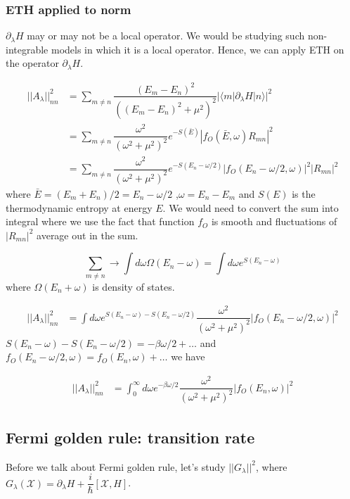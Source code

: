 \documentclass[11pt,a4paper]{article}
\begin{document}
\subsubsection{ETH applied to norm}
$\partial_{\lambda}H$ may or may not be a local operator. We would be studying such non-integrable models in which it is a local operator. Hence, we can apply ETH on the operator $\partial_{\lambda}H$.

\begin{align*}
||A_{\lambda}||^2_{nn} &= \sum_{m \neq n}  \dfrac{(E_m-E_n)^2}{((E_m-E_n)^2 + \mu^2)^2} |\langle m | \partial_{\lambda}H| n \rangle|^2\\
&=\sum_{m \neq n}  \dfrac{\omega^2}{(\omega^2 + \mu^2)^2} e^{-S(\bar{E})} |f_O(\bar{E}, \omega) R_{mn}|^2\\
&=\sum_{m \neq n}  \dfrac{\omega^2}{(\omega^2 + \mu^2)^2} e^{-S(E_n -\omega/2)} |f_O(E_n - \omega/2, \omega)|^2 |R_{mn}|^2
\end{align*}
where $\bar{E}= (E_m +E_n)/2=E_n - \omega/2$ ,$ \omega= E_n- E_m$ and $S(E)$ is the thermodynamic entropy at energy $E$.
We would need to convert the sum into integral where we use the fact that function $f_O$ is smooth and fluctuations of $|R_{mn}|^2$ average out in the sum.

\begin{equation}
\sum_{m \neq n}  \rightarrow \int d \omega \Omega(E_{n}- \omega)= \int d \omega e^{S(E_{n}- \omega)}
\end{equation}
where $\Omega(E_{n}+ \omega)$ is density of states.


\begin{align*}
||A_{\lambda}||^2_{nn} &=\int d \omega e^{S(E_{n}- \omega)-S(E_n -\omega/2)} \dfrac{\omega^2}{(\omega^2 + \mu^2)^2}  |f_O(E_n - \omega/2, \omega)|^2 
\end{align*}
$S(E_{n}- \omega)-S(E_n -\omega/2) = -\beta \omega/2 + \ldots $ and $f_O(E_n - \omega/2, \omega)=f_O(E_n, \omega) + \ldots $ we have

\begin{align*}
||A_{\lambda}||^2_{nn} &=\int_0^{\infty} d \omega e^{-\beta \omega/2} \dfrac{\omega^2}{(\omega^2 + \mu^2)^2}  |f_O(E_n, \omega)|^2 
\end{align*}
\subsection{Fermi golden rule: transition rate}
Before we talk about Fermi golden rule, let's study  $||   G_{\lambda}||^2$, where $G_{\lambda}(\mathcal{X} )= \partial_{\lambda} H + \dfrac{i}{\hbar} [\mathcal{X}, H] $.
\end{document}
